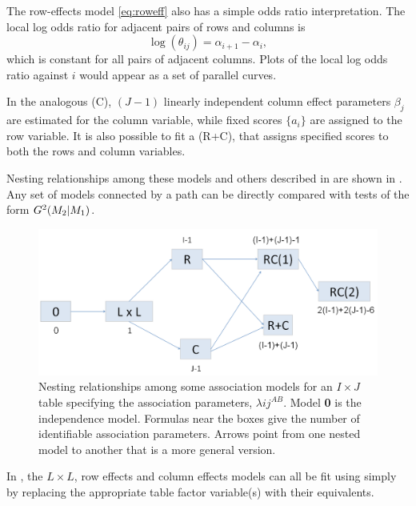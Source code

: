 \documentclass[11pt]{book}\usepackage[]{graphicx}\usepackage[]{color}
\begin{document}
The row-effects model \eqref{eq:roweff} also has a simple odds ratio interpretation.
The local log odds ratio for adjacent pairs of rows and columns is
\begin{equation*}
\log (\theta_{ij}) =
  \alpha_{i+1} - \alpha_i
  \comma
\end{equation*}
which is constant for all pairs of adjacent columns.  Plots of the
local log odds ratio against $i$ would appear as a set of parallel
curves.

In the analogous  (C), $(J-1)$ linearly independent
column effect
parameters $\beta_j$ are estimated for the column variable, while fixed
scores $\{a_i\}$ are assigned to the row variable. It is also possible to
fit a  (R+C), that assigns specified
scores to both the rows and column variables.

Nesting relationships among these models and others described in
are shown in .
Any set of models connected by a path can be directly compared with
\LR tests of the form $G^2 (M_2 | M_1)$.

\begin{figure}
  \centering
  \includegraphics[width=\textwidth]{ch08/fig/assoc-models}
  \caption{Nesting relationships among some association models for an $I \times J$ table
  specifying the association parameters, $\lambda{ij}^{AB}$.
  Model \textbf{0} is the independence model.
  Formulas near the boxes give the number of identifiable association parameters.
  Arrows point from one nested model to another that is a more general version.}
  \label{fig:assoc-models}
\end{figure}

In \R, the $L \times L$, row effects and column effects models can
all be fit using  simply by replacing the appropriate
table factor variable(s) with their 
equivalents.
\end{document}
